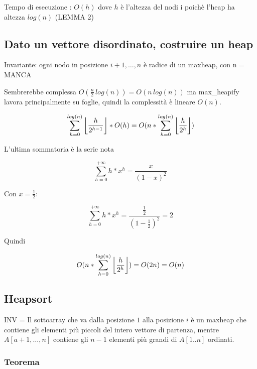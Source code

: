 \documentclass{article}
\DeclarePairedDelimiter\floor{\lfloor}{\rfloor}
\begin{document}
{{

{Tempo di esecuzione : $O(h)$ dove $h$ è l'altezza del nodi i poichè l'heap ha altezza $log(n)$ (LEMMA 2)}

\subsection{Dato un vettore disordinato, costruire un heap}



{Invariante: ogni nodo in posizione $i+1,\ldots,n$ è radice di un maxheap, con n = MANCA}

{Sembrerebbe complessa $O(\frac{n}{2}\,log(n)) = O(n\,log(n))$ ma max\_heapify lavora principalmente su foglie, quindi la complessità è lineare $O(n)$.}

\begin{equation}
\sum_{h=0}^{log(n)}{\floor*{\frac{h}{2^{h-1}}}*O(h)} = O(n*\sum_{h=0}^{log(n)}{\floor*{\frac{h}{2^h}})}
\end{equation}

{L'ultima sommatoria è la serie nota}

\begin{equation}
\sum_{h=0}^{+\infty}{h*x^h} = \frac{x}{{(1-x)}^2}
\end{equation}

{Con $x=\frac{1}{2}$:}

\begin{equation}
\sum_{h=0}^{+\infty}{h*x^h} = \frac{\frac{1}{2}}{{(1-\frac{1}{2})}^2} = 2
\end{equation}

{Quindi}

\begin{equation}
O(n*\sum_{h=0}^{log(n)}{\floor*{\frac{h}{2^h}}}) = O(2n) = O(n)
\end{equation}

\subsection{Heapsort}



{INV = Il sottoarray che va dalla posizione $1$ alla posizione $i$ è un maxheap che contiene gli elementi più piccoli del intero vettore di partenza, mentre $A[a+1,\ldots,n]$ contiene gli $n-1$ elementi più grandi di $A[1..n]$ ordinati}{.}

\subsubsection{Teorema}

}}
\end{document}
